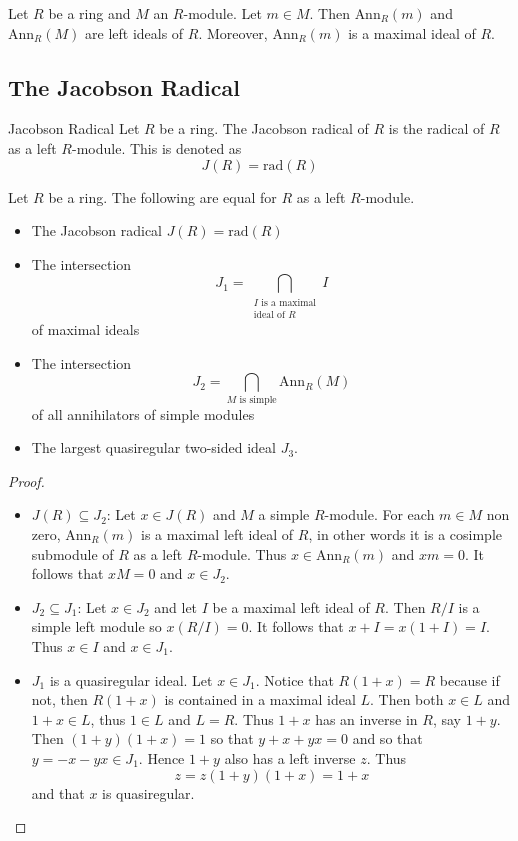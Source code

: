 \documentclass[a4paper]{article}
\begin{document}
\begin{lmm}{}{} Let $R$ be a ring and $M$ an $R$-module. Let $m\in M$. Then $\text{Ann}_R(m)$ and $\text{Ann}_R(M)$ are left ideals of $R$. Moreover, $\text{Ann}_R(m)$ is a maximal ideal of $R$. 
\end{lmm}

\subsection{The Jacobson Radical}
\begin{defn}{Jacobson Radical}{} Let $R$ be a ring. The Jacobson radical of $R$ is the radical of $R$ as a left $R$-module. This is denoted as $$J(R)=\text{rad}(R)$$
\end{defn}

\begin{thm}{}{} Let $R$ be a ring. The following are equal for $R$ as a left $R$-module. 
\begin{itemize}
\item The Jacobson radical $J(R)=\text{rad}(R)$
\item The intersection $$J_1=\bigcap_{\substack{I\text{ is a maximal}\\\text{ideal of }R}}I$$ of maximal ideals
\item The intersection $$J_2=\bigcap_{M\text{ is simple}}\text{Ann}_R(M)$$ of all annihilators of simple modules
\item The largest quasiregular two-sided ideal $J_3$. 
\end{itemize} \tcbline
\begin{proof}~\\
\begin{itemize}
\item $J(R)\subseteq J_2$: Let $x\in J(R)$ and $M$ a simple $R$-module. For each $m\in M$ non zero, $\text{Ann}_R(m)$ is a maximal left ideal of $R$, in other words it is a cosimple submodule of $R$ as a left $R$-module. Thus $x\in\text{Ann}_R(m)$ and $xm=0$. It follows that $xM=0$ and $x\in J_2$. 

\item $J_2\subseteq J_1$: Let $x\in J_2$ and let $I$ be a maximal left ideal of $R$. Then $R/I$ is a simple left module so $x(R/I)=0$. It follows that $x+I=x(1+I)=I$. Thus $x\in I$ and $x\in J_1$. 

\item $J_1$ is a quasiregular ideal. Let $x\in J_1$. Notice that $R(1+x)=R$ because if not, then $R(1+x)$ is contained in a maximal ideal $L$. Then both $x\in L$ and $1+x\in L$, thus $1\in L$ and $L=R$. Thus $1+x$ has an inverse in $R$, say $1+y$. Then $(1+y)(1+x)=1$ so that $y+x+yx=0$ and so that $y=-x-yx\in J_1$. Hence $1+y$ also has a left inverse $z$. Thus $$z=z(1+y)(1+x)=1+x$$ and that $x$ is quasiregular. 


\end{itemize}
\end{proof}
\end{thm}
\end{document}
